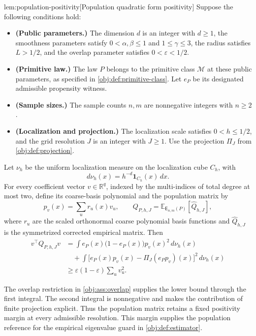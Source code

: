 \begin{lemmav}{lem:population-positivity}[Population quadratic form positivity]
Suppose the following conditions hold:
\begin{itemize}
\item \textbf{(Public parameters.)} The dimension \(d\) is an integer with \(d\ge1\), the smoothness parameters satisfy \(0<\alpha,\beta\le1\) and \(1\le\gamma\le3\), the radius satisfies \(L>1/2\), and the overlap parameter satisfies \(0<\varepsilon<1/2\).
\item \textbf{(Primitive law.)} The law \(P\) belongs to the primitive class \(\mathcal M\) at these public parameters, as specified in \cref{obj:def:primitive-class}. Let \(e_P\) be its designated admissible propensity witness.
\item \textbf{(Sample sizes.)} The sample counts \(n,m\) are nonnegative integers with \(n\ge2\).
\item \textbf{(Localization and projection.)} The localization scale satisfies \(0<h\le1/2\), and the grid resolution \(J\) is an integer with \(J\ge1\). Use the projection \(\Pi_J\) from \cref{obj:def:projection}.
\end{itemize}
Let \(\nu_h\) be the uniform localization measure on the localization cube \(C_h\), with
\[
d\nu_h(x)=h^{-d}\mathbf 1_{C_h}(x)\,dx.
\]
For every coefficient vector \(v\in\mathbb R^q\), indexed by the multi-indices of total degree at most two, define its coarse-basis polynomial and the population matrix by
\[
p_v(x)=\sum_u r_u(x)v_u,
\qquad
Q_{P,h,J}
=\mathbb E_{\mathsf E_{n,m}(P)}[\widehat Q_{h,J}],
\]
where \(r_u\) are the scaled orthonormal coarse polynomial basis functions and \(\widehat Q_{h,J}\) is the symmetrized corrected empirical matrix. Then
\[
\begin{aligned}
v^\top Q_{P,h,J}v
&=\int e_P(x)\bigl(1-e_P(x)\bigr)p_v(x)^2\,d\nu_h(x)\\
&\quad+\int
\bigl[e_P(x)p_v(x)-\Pi_J(e_Pp_v)(x)\bigr]^2\,d\nu_h(x)\\
&\ge \varepsilon(1-\varepsilon)\sum_u v_u^2.
\end{aligned}
\]
\end{lemmav}

The overlap restriction in \cref{obj:ass:overlap} supplies the lower bound through the first integral. The second integral is nonnegative and makes the contribution of finite projection explicit. Thus the population matrix retains a fixed positivity margin at every admissible resolution. This margin supplies the population reference for the empirical eigenvalue guard in \cref{obj:def:estimator}.

